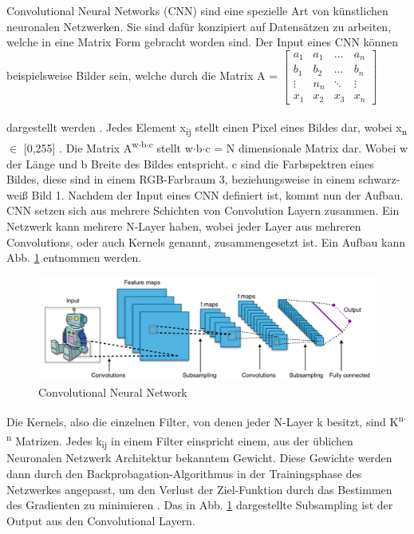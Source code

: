 \documentclass{llncs}
\begin{document}
Convolutional  Neural Networks (CNN) sind eine spezielle Art von künstlichen neuronalen Netzwerken. Sie sind dafür konzipiert auf Datensätzen zu arbeiten, welche in eine Matrix Form gebracht worden sind. Der Input eines CNN können beispielsweise Bilder sein, welche durch die Matrix A =
$
\begin{bmatrix}
a_1	& a_1	& \dots	 & a_n     \\
b_1	& b_2 	& \dots  & b_n	  \\
\vdots	& n_n 	& \ddots & \vdots \\
x_1 	& x_2 & x_3	 & x_n
\end{bmatrix}
$
\\\\dargestellt werden \cite{Grundlagen}. Jedes Element x\textsubscript{ij} stellt einen Pixel eines Bildes dar, wobei x\textsubscript{n} $\in$ [0,255] . Die Matrix A\textsuperscript{w$\cdot$b$\cdot$c} stellt w$\cdot$b$\cdot$c = N dimensionale Matrix dar. Wobei w der Länge und b Breite des Bildes entspricht. c sind die Farbspektren eines Bildes, diese sind in einem RGB-Farbraum 3, beziehungsweise in einem schwarz-weiß Bild 1. Nachdem  der Input eines CNN definiert ist, kommt nun der Aufbau. CNN setzen sich aus mehrere Schichten von Convolution Layern zusammen. Ein Netzwerk kann mehrere N-Layer haben, wobei jeder Layer aus mehreren Convolutions, oder auch Kernels genannt, zusammengesetzt ist. Ein Aufbau kann Abb. \ref{fig:Bild10} entnommen werden.
\begin{figure}[htbp] 
	\centering
	\includegraphics[width=1.0\textwidth]{convol.png}
	\caption{Convolutional Neural Network}
	\label{fig:Bild10}
\end{figure}
Die Kernels, also die einzelnen Filter, von denen jeder N-Layer k besitzt, sind K\textsuperscript{n$\cdot$n} Matrizen. Jedes k\textsubscript{ij} in einem Filter einspricht einem, aus der üblichen Neuronalen Netzwerk Architektur bekanntem Gewicht. Diese Gewichte werden dann durch den Backprobagation-Algorithmus in der Trainingsphase des Netzwerkes angepasst, um den Verlust der Ziel-Funktion durch das Bestimmen des Gradienten zu minimieren \cite{Grundlagen}. Das in Abb. \ref{fig:Bild10} dargestellte Subsampling ist der Output aus den Convolutional Layern. 
\end{document}
